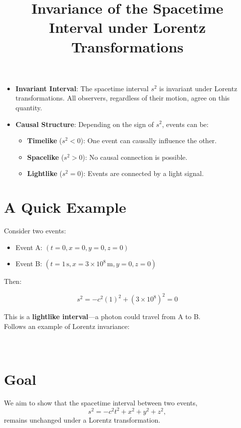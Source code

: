 \documentclass{article}
\begin{document}
	\begin{itemize}
		\item \textbf{Invariant Interval}: The spacetime interval $s^2$ is invariant under Lorentz transformations. All observers, regardless of their motion, agree on this quantity.
		\item \textbf{Causal Structure}: Depending on the sign of $s^2$, events can be:
		\begin{itemize}
			\item \textbf{Timelike} ($s^2 < 0$): One event can causally influence the other.
			\item \textbf{Spacelike} ($s^2 > 0$): No causal connection is possible.
			\item \textbf{Lightlike} ($s^2 = 0$): Events are connected by a light signal.
		\end{itemize}
	\end{itemize}
	
	\section*{A Quick Example}
	
	Consider two events:
	\begin{itemize}
		\item Event A: $(t = 0, x = 0, y = 0, z = 0)$
		\item Event B: $(t = 1\,\text{s}, x = 3 \times 10^8\,\text{m}, y = 0, z = 0)$
	\end{itemize}
	
	Then:
	
	\[
	s^2 = -c^2(1)^2 + (3 \times 10^8)^2 = 0
	\]
	
	This is a \textbf{lightlike interval}—a photon could travel from A to B.\\
	
Follows an example of Lorentz invariance:\\
\\
\\
\title{ Invariance of the Spacetime Interval under Lorentz Transformations}

	\maketitle
	
	\section*{Goal}
	
	We aim to show that the spacetime interval between two events,
	\[
	s^2 = -c^2 t^2 + x^2 + y^2 + z^2,
	\]
	remains unchanged under a Lorentz transformation.
	
\end{document}
